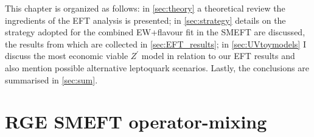 This chapter is organized as follows: in \autoref{sec:theory} a theoretical review the ingredients of the EFT analysis is presented; in \autoref{sec:strategy} details on the strategy adopted for the combined EW+flavour fit in the SMEFT are discussed, the results from which are collected in \autoref{sec:EFT_results}; in \autoref{sec:UVtoymodels} I discuss the most economic viable $Z^{\prime}$ model in relation to our EFT results and also mention possible alternative leptoquark scenarios. Lastly, the conclusions are summarised in \autoref{sec:sum}.
\section{RGE SMEFT operator-mixing}
\label{sec:theory}

